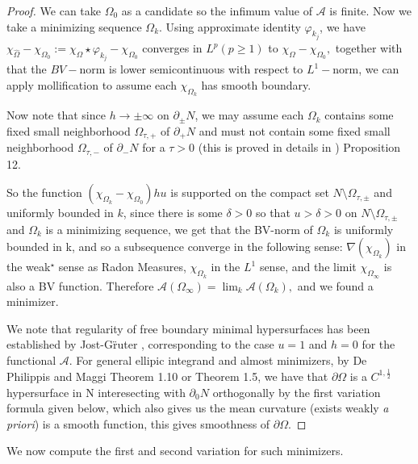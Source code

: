 \documentclass[12pt]{amsart}
\newcommand{\p}{\partial}
\numberwithin{equation}{section}
\begin{document}
	\begin{proof}
		We can take $\Omega_0$ as a candidate so the infimum value of $\mathcal{A}$ is finite. Now we take a minimizing sequence $\Omega_k$. 
		Using approximate identity $\varphi_{k_j}$, we have $\chi_{\hat{\Omega}}-\chi_{\Omega_0}:=\chi_{\Omega} \star \varphi_{k_j}-\chi_{\Omega_0}$ converges in $L^p(p\geq 1)$ to $\chi_{\Omega}-\chi_{\Omega_0},$ together with that the $BV-$norm is lower semicontinuous with respect to $L^1-$norm, we can apply mollification to assume each $\chi_{\Omega_k}$ has smooth boundary. 

		Now note that since $h\rightarrow \pm\infty$ on $\partial_{\pm} N$, we may assume each $\Omega_k$ contains some fixed small neighborhood $\Omega_{\tau,+}$ of $\partial_{+} N$ and must not contain some fixed small neighborhood $\Omega_{\tau,-}$ of $\partial_{-} N$ for a $\tau>0$ (this is proved in details in \cite{ChodoLiStryk2022-CompleteStableMinimal}) Proposition 12. 
		
		So the function $(\chi_{\Omega_k}-\chi_{\Omega_0})hu$ is supported on the compact set $N \setminus \Omega_{\tau,\pm}$ and uniformly bounded in $k$, 
		since there is some $\delta>0$ so that $u>\delta>0$ on $N \setminus \Omega_{\tau,\pm}$ and $\Omega_k$ is a minimizing sequence, we get that the BV-norm of $\Omega_k$ is uniformly bounded in k, and so a subsequence converge in the following sense: $\nabla(\chi_{\Omega_k})$ in the weak$^{\star}$ sense as Radon Measures, $\chi_{\Omega_k}$  in the $L^1$ sense, and the limit $\chi_{\Omega_{\infty}}$ is also a BV function. Therefore $\mathcal{A}(\Omega_{\infty})=\lim_k \mathcal{A}(\Omega_{k}),$ and we found a minimizer.


		We note that regularity of free boundary minimal hypersurfaces has been established by Jost-G\"ruter \cite{GruteJost1986-AllardTypeRegularity}, corresponding to the case $u=1$ and $h=0$ for the functional $\mathcal{A}$. For general ellipic integrand and almost minimizers, by De Philippis and Maggi \cite{DePhMaggi2014-RegularityFreeBoundaries} Theorem 1.10 or \cite{DePhMaggi2014-DimensionalEstimatesSingular} Theorem 1.5, we have that $\p \Omega$ is a $C^{1,\frac{1}{2}}$ hypersurface in N interesecting with $\p_0 N$ orthogonally by the first variation formula given below, which also gives us the mean curvature (exists weakly \textit{a priori}) is a smooth function, this gives smoothness of $\p \Omega$.
	\end{proof}


	We now compute the first and second variation for such minimizers.
\end{document}

